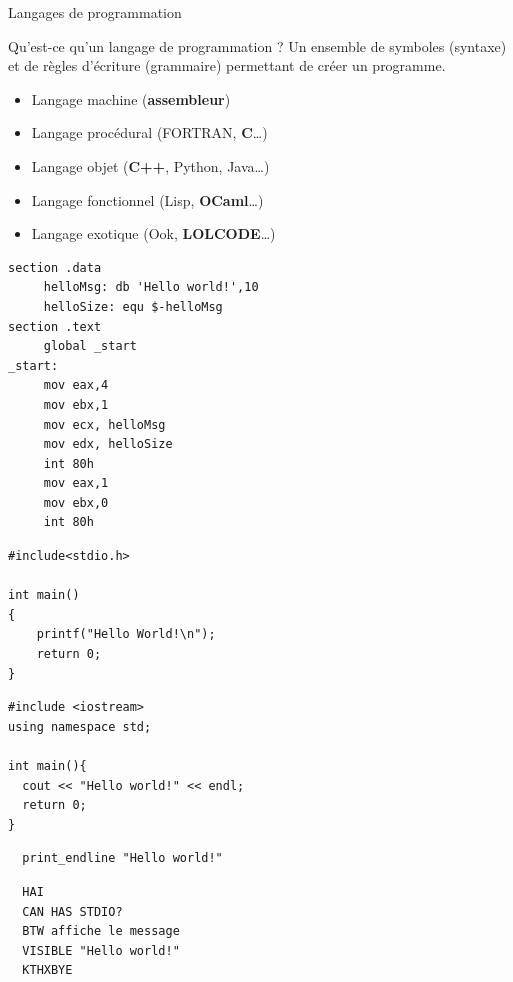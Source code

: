 \begin{frame}[fragile]{Langages de programmation}
  \begin{block}{Qu'est-ce qu'un langage de programmation ?}
  Un ensemble de symboles (syntaxe) et de règles d'écriture (grammaire) permettant de créer un programme.
  \end{block}
  \begin{minipage}{0.40\linewidth}
	\begin{itemize}[<+->]
		\item Langage machine (\textbf{assembleur})
		\item Langage procédural (FORTRAN, \textbf{C}\dots)
		\item Langage objet (\textbf{C++}, Python, Java\dots)
		\item Langage fonctionnel (Lisp, \textbf{OCaml}\dots)
		\item Langage exotique (Ook, \textbf{LOLCODE}\dots)
	\end{itemize}
  \end{minipage}
  \hfill
  \begin{minipage}{0.58\linewidth}
	\begin{overprint}
	\begin{verbatim}
section .data
     helloMsg: db 'Hello world!',10
     helloSize: equ $-helloMsg
section .text
     global _start
_start:
     mov eax,4
     mov ebx,1
     mov ecx, helloMsg
     mov edx, helloSize
     int 80h
     mov eax,1
     mov ebx,0
     int 80h
	\end{verbatim}
	\begin{verbatim}
#include<stdio.h>

int main()
{
    printf("Hello World!\n");
    return 0;
}
	\end{verbatim}
	\begin{verbatim}
#include <iostream>
using namespace std;

int main(){
  cout << "Hello world!" << endl;
  return 0;
}
	\end{verbatim}
	\begin{verbatim}
  print_endline "Hello world!"
	\end{verbatim}
	\begin{verbatim}
  HAI
  CAN HAS STDIO?
  BTW affiche le message
  VISIBLE "Hello world!"
  KTHXBYE
	  \end{verbatim}
	\end{overprint}
  \end{minipage}
\end{frame}


